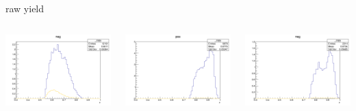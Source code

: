 \begin{frame}{raw yield}
\begin{columns}
\begin{column}[T]{0.25\textwidth}
\includegraphics[width = \textwidth]{results/yield/statistics/yield_x_Q2_z_0.60_5.500_0.65_neg.png}
\end{column}
\begin{column}[T]{0.25\textwidth}
\includegraphics[width = \textwidth]{results/yield/statistics/yield_x_Q2_z_0.60_5.500_0.90_pos.png}
\end{column}
\begin{column}[T]{0.25\textwidth}
\includegraphics[width = \textwidth]{results/yield/statistics/yield_x_Q2_z_0.60_5.500_0.90_neg.png}
\end{column}
\end{columns}
\end{frame}
